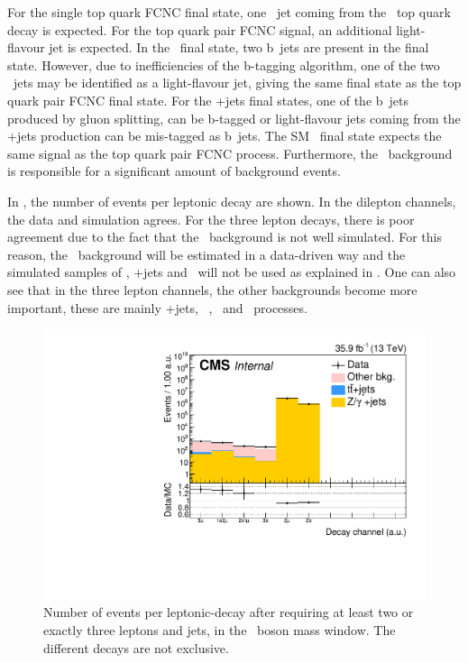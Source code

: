 For the single top quark FCNC final state, one \Pbottom\ jet coming from the \SM\ top quark decay is expected. For the top quark pair FCNC signal, an additional light-flavour jet is expected. In the \ttZ\ final state, two b~jets are present in the final state. However, due to inefficiencies of the b-tagging algorithm, one of the two \Pbottom\ jets may be identified as a light-flavour jet, giving the same final state as the top quark pair FCNC final state. For the \WZ+jets final states, one of the b~jets produced by gluon splitting, can be b-tagged or light-flavour jets coming from the \WZ+jets production can be mis-tagged as b~jets. The SM \tZq\ final state expects the same signal as the top quark pair FCNC process. Furthermore, the \NPL\  background is responsible for a  significant amount of background events. 

In , the number of events per leptonic decay are shown. In the dilepton channels, the data and simulation agrees. For the three lepton decays, there is poor agreement due to the fact that the \NPL\ background is not well simulated.  For this reason, the \NPL\ background will be estimated in a data-driven way and the simulated samples of \DY, \ttbar+jets and \WW\ will not be used as explained in . One can also see that in the three lepton channels, the other backgrounds become more important, these are mainly \WZ+jets, \SM\ \tZq, \ttZ\ and \ZZ\ processes.
\begin{figure}[htbp]
	\centering
	\includegraphics[width=0.58\linewidth]{5_EventSelection/Figures/control_dilep_Decay_StackLogY.pdf}
	\caption{Number of events per leptonic-decay after requiring at least two or exactly three leptons and jets, in the \PZ\ boson mass window. The different decays are not exclusive. }
	\label{fig:controldilepdecaystacklogy}
\end{figure}



